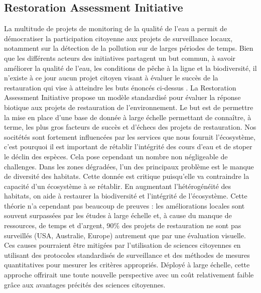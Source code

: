 \documentclass[10pt, article]{llncs}
\begin{document}
	\subsection{Restoration Assessment Initiative}
		La multitude de projets de monitoring de la qualité de l'eau a permit de démocratiser la participation citoyenne aux projets de surveillance locaux, notamment sur la détection de la pollution sur de larges périodes de temps. Bien que les différents acteurs des initiatives partagent un but commun, à savoir améliorer la qualité de l'eau, les conditions de pêche à la ligne et la biodiversité, il n'existe à ce jour aucun projet citoyen visant à évaluer le succès de la restauration qui vise à atteindre les buts énoncés ci-dessus \cite{huddart_citizen_2016}. La Restoration Assessment Initiative propose un modèle standardisé pour évaluer la réponse biotique aux projets de restauration de l'environnement. Le but est de permettre la mise en place d'une base de donnée à large échelle permettant de connaître, à terme, les plus gros facteurs de succès et d'échecs des projets de restauration. Nos socitétés sont fortement influencées par les services que nous fournit l'écosystème, c'est pourquoi il est important de rétablir l'intégrité des cours d'eau et de stoper le déclin des espèces. Cela pose cependant un nombre non négligeable de challenges.
		Dans les zones dégradées, l'un des principaux problème est le manque de diversité des habitats. Cette donnée est critique puisqu'elle va contraindre la capacité d'un écosystème à se rétablir. En augmentant l'hétérogénéité des habitats, on aide à restaurer la biodiversité et l'intégrité de l'écosystème. Cette théorie n'a cependant pas beaucoup de preuves : les améliorations locales sont souvent surpassées par les études à large échelle et, à cause du manque de ressources, de temps et d'argent, 90\% des projets de restauration ne sont pas surveillés (USA, Australie, Europe) autrement que par une évaluation visuelle. Ces causes pourraient être mitigées par l'utilisation de sciences citoyennes en utilisant des protocoles standardisés de surveillance et des méthodes de mesures quantitatives pour mesurer les critères appropriés. Déployé à large échelle, cette approche offrirait une toute nouvelle perspective avec un coût relativement faible grâce aux avantages précités des sciences citoyennes.\\
\end{document}
